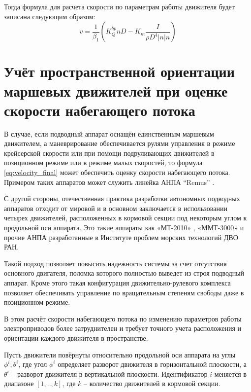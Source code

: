 Тогда формула для расчета скорости по параметрам работы движителя будет записана следующим образом:
\begin{equation}
    \label{eq:velocity_final}
    v = \frac{1}{\beta_1} \left( K_Q^{bp} n D - K_m\frac{I}{\rho D^4|n|n} \right)
\end{equation}

\section{Учёт пространственной ориентации маршевых движителей при оценке скорости набегающего потока}
В случае, если подводный аппарат оснащён единственным маршевым движителем, а маневрирование обеспечивается рулями управления в режиме крейсерской скорости или при помощи подруливающих движителей в позиционном режиме или в режиме малых скоростей, то формула \ref{eq:velocity_final} может обеспечить оценку скорости набегающего потока.
Примером таких аппаратов может служить линейка АНПА ``Remus'' \cite{allen1997remus, kukulya2010under}.

С другой стороны, отечественная практика разработки автономных подводных аппаратов отходит от мировой и в основном заключается в использовании четырех движителей, расположенных в кормовой секции под некоторым углом к продольной оси аппарата.
Это такие аппараты как «МТ-2010» \cite{борейко2011малогабаритный}, «ММТ-3000» \cite{горнак2007ммт} и прочие АНПА разработанные в Институте проблем морских технологий ДВО РАН. 

Такой подход позволяет повысить надежность системы за счет отсутствия основного двигателя, поломка которого полностью выведет из строя подводный аппарат.
Кроме этого такая конфигурация движительно-рулевого комплекса позволяет обеспечивать управление по вращательным степеням свободы даже в позиционном режиме.

В этом расчёт скорости набегающего потока по изменению параметров работы электроприводов более затруднителен и требует точного учета расположения и ориентации каждого движителя в пространстве.

Пусть движители повёрнуты относительно продольной оси аппарата на углы $\phi^i, \theta^i$, где угол $\phi^i$ определяет разворот движителя в горизонтальной плоскости, а $\theta^i$ -- разворот движителя в вертикальной плоскости.
Идентификатор $i$ меняется в диапазоне $[1,..,k]$, где $k$ -- количество движителей в кормовой секции.

